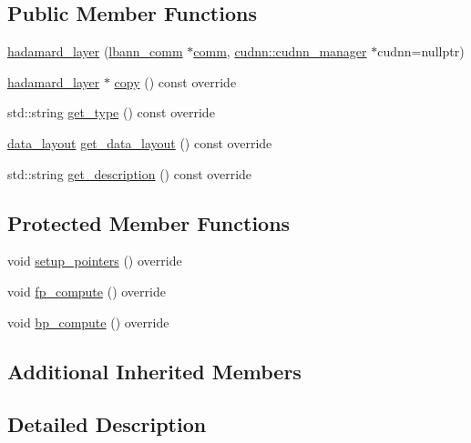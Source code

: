 \subsection*{Public Member Functions}
\begin{DoxyCompactItemize}
\item 
\hyperlink{classlbann_1_1hadamard__layer_af79b4f3d1e2709092b36fb0f38d30430}{hadamard\+\_\+layer} (\hyperlink{classlbann_1_1lbann__comm}{lbann\+\_\+comm} $\ast$\hyperlink{file__io_8cpp_ab048c6f9fcbcfaa57ce68b00263dbebe}{comm}, \hyperlink{classlbann_1_1cudnn_1_1cudnn__manager}{cudnn\+::cudnn\+\_\+manager} $\ast$cudnn=nullptr)
\item 
\hyperlink{classlbann_1_1hadamard__layer}{hadamard\+\_\+layer} $\ast$ \hyperlink{classlbann_1_1hadamard__layer_ae194aeb83fefa09a45ff4b534839e667}{copy} () const override
\item 
std\+::string \hyperlink{classlbann_1_1hadamard__layer_a2981073aa177cc71da8c0e83563a7fa0}{get\+\_\+type} () const override
\item 
\hyperlink{base_8hpp_a786677cbfb3f5677b4d84f3056eb08db}{data\+\_\+layout} \hyperlink{classlbann_1_1hadamard__layer_ac7a67a906eaa7810997fa6448337f192}{get\+\_\+data\+\_\+layout} () const override
\item 
std\+::string \hyperlink{classlbann_1_1hadamard__layer_ad575b8b5efddaf3ee64c358b28198de9}{get\+\_\+description} () const override
\end{DoxyCompactItemize}
\subsection*{Protected Member Functions}
\begin{DoxyCompactItemize}
\item 
void \hyperlink{classlbann_1_1hadamard__layer_a712faa83429f6a77a6c43c8afde4ddaa}{setup\+\_\+pointers} () override
\item 
void \hyperlink{classlbann_1_1hadamard__layer_a8be44f24f2290b06b104294d1fe31d41}{fp\+\_\+compute} () override
\item 
void \hyperlink{classlbann_1_1hadamard__layer_a2150c54cc21fb5dc51d77119c20c6c21}{bp\+\_\+compute} () override
\end{DoxyCompactItemize}
\subsection*{Additional Inherited Members}


\subsection{Detailed Description}
